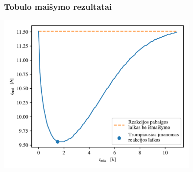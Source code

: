 \documentclass{beamer}
\begin{document}
\begin{frame}
    \frametitle{Tobulo maišymo rezultatai}
    \centering
    \includegraphics[width=10cm]{paper/assets/mix-end-1.png}
\end{frame}
\end{document}
